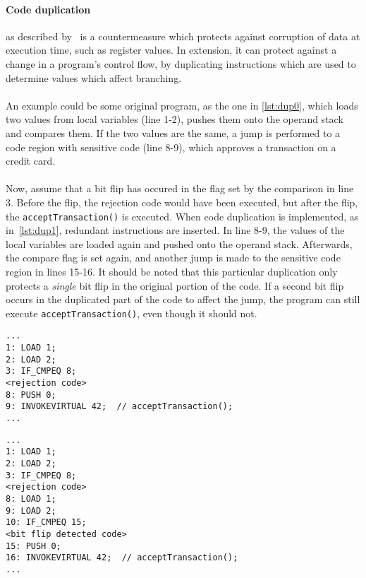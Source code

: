 \paragraph{Code duplication}as described by~\cite[p. 12]{javasec} is a countermeasure which protects against corruption of data at execution time, such as register values. In extension, it can protect against a change in a program's control flow, by duplicating instructions which are used to determine values which affect branching.\\\\
An example could be some original program, as the one in \cref{lst:dup0}, which loads two values from local variables (line 1-2), pushes them onto the operand stack and compares them. If the two values are the same, a jump is performed to a code region with sensitive code (line 8-9), which approves a transaction on a credit card.\\\\
Now, assume that a bit flip has occured in the flag set by the comparison in line 3. Before the flip, the rejection code would have been executed, but after the flip, the \texttt{acceptTransaction()} is executed. When code duplication is implemented, as in~\cref{lst:dup1}, redundant instructions are inserted. In line 8-9, the values of the local variables are loaded again and pushed onto the operand stack. Afterwards, the compare flag is set again, and another jump is made to the sensitive code region in lines 15-16. It should be noted that this particular duplication only protects a \textit{single} bit flip in the original portion of the code. If a second bit flip occurs in the duplicated part of the code to affect the jump, the program can still execute \texttt{acceptTransaction()}, even though it should not.

\begin{minipage}{\linewidth}
\begin{lstlisting}[caption={Original program without code duplication implemented. The code is written in \jcl. Note that for simplicity, the numbers in the left side are line numbers and do not denote the program counter values.}, label={lst:dup0}]
...
1: LOAD 1;
2: LOAD 2;
3: IF_CMPEQ 8;
<rejection code>
8: PUSH 0;
9: INVOKEVIRTUAL 42;  // acceptTransaction();
...
\end{lstlisting}
\end{minipage}

\begin{minipage}{\linewidth}
\begin{lstlisting}[caption={Modified program with code duplication implemented. The code is written in \jcl. Note that for simplicity, the numbers in the left side are line numbers and do not denote the program counter values.}, label={lst:dup1}]
...
1: LOAD 1;
2: LOAD 2;
3: IF_CMPEQ 8;
<rejection code>
8: LOAD 1;
9: LOAD 2;
10: IF_CMPEQ 15;
<bit flip detected code>
15: PUSH 0;
16: INVOKEVIRTUAL 42;  // acceptTransaction();
...
\end{lstlisting}
\end{minipage}